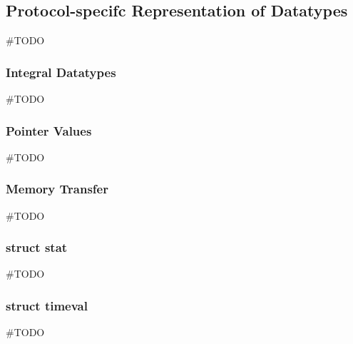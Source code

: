 \subsection{Protocol-specifc Representation of Datatypes}
\#TODO

	\subsubsection*{Integral Datatypes}
	\#TODO

	\subsubsection*{Pointer Values}
	\#TODO

	\subsubsection*{Memory Transfer}
	\#TODO

	\subsubsection*{struct stat}
	\#TODO

	\subsubsection*{struct timeval}
	\#TODO

